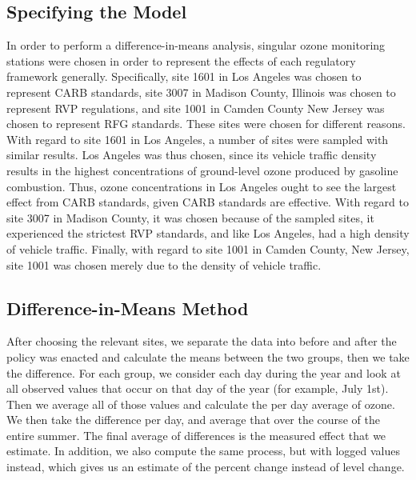 \documentclass{article}
\begin{document}
\subsection {Specifying the Model}
In order to perform a difference-in-means analysis, singular ozone monitoring stations were chosen in order to represent the effects of each regulatory framework generally. Specifically, site 1601 in Los Angeles was chosen to represent CARB standards, site 3007 in Madison County, Illinois was chosen to represent RVP regulations, and site 1001 in Camden County New Jersey was chosen to represent RFG standards. These sites were chosen for different reasons. With regard to site 1601 in Los Angeles, a number of sites were sampled with similar results. Los Angeles was thus chosen, since its vehicle traffic density results in the highest concentrations of ground-level ozone produced by gasoline combustion. Thus, ozone concentrations in Los Angeles ought to see the largest effect from CARB standards, given CARB standards are effective. With regard to site 3007 in Madison County, it was chosen because of the sampled sites, it experienced the strictest RVP standards, and like Los Angeles, had a high density of vehicle traffic. Finally, with regard to site 1001 in Camden County, New Jersey, site 1001 was chosen merely due to the density of vehicle traffic.

\subsection {Difference-in-Means Method}
After choosing the relevant sites, we separate the data into before and after the policy was enacted and calculate the means between the two groups, then we take the difference. For each group, we consider each day during the year and look at all observed values that occur on that day of the year (for example, July 1st). Then we average all of those values and calculate the per day average of ozone. We then take the difference per day, and average that over the course of the entire summer. The final average of differences is the measured effect that we estimate. In addition, we also compute the same process, but with logged values instead, which gives us an estimate of the percent change instead of level change. 
\end{document}
